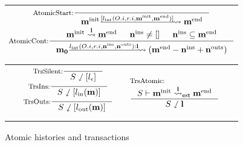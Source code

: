 \begin{figure}[t]
  \centering
  \begin{tabular}{|c|}
    \hline
    \begin{math}
      \arraycolsep=-2pt
      \begin{array}{c}
        \inference[AtomicStart:]{}{\atomicLong{\listof{\amsgi{m}}}{\listsingle{\lblInt{\idxOf{O}}{\idxOf{r}}{\listof{\amsgi{m}}}{\listof{\amsge{m}}}}}{\listof{\amsge{m}}}} \\
        \inference[AtomicCont:]{\atomic{\listof{\amsgi{m}}}{\listof{l}}{\listof{\amsge{m}}}
          & \msgIns{n} \neq \listnil
          & \msgIns{n} \subseteq \listof{\amsge{m}}}{\atomicLong{\listof{m_0}}{\listcons{\lblInt{\idxOf{O}}{\idxOf{r}}{\msgIns{n}}{\msgOuts{n}}}{\listof{l}}}{(\listapp{\listsub{\listof{\amsge{m}}}{\msgIns{n}}}{\msgOuts{n}}})} \\
        \mbox{}\vspace{-5pt} %
      \end{array}
    \end{math}\\
    \hline
    \begin{math}
      \begin{array}{cc}
        \begin{array}{c}
          \inference[TrsSilent:]{}{\trsn{S}{\listsingle{\lblEmpty{}}}} \\
          \inference[TrsIns:]{}{\trsn{S}{\listsingle{\lblIns{\listof{m}}}}} \\
          \inference[TrsOuts:]{}{\trsn{S}{\listsingle{\lblOuts{\listof{m}}}}} \\
          \mbox{}\vspace{-5pt} %
        \end{array} &
        \begin{array}{l}
          \textrm{\footnotesize TrsAtomic:} \\
          \inference[]{\extatomic{S}{\listof{\amsgi{m}}}{\listof{l}}{\listof{\amsge{m}}}}{\trsn{S}{\listof{l}}}
        \end{array} \\
      \end{array}
    \end{math}\\
    \hline
  \end{tabular}
  \caption{Atomic histories and transactions}
  \vspace{-5pt}
  \label{fig-hemiola-trs}
\end{figure}

